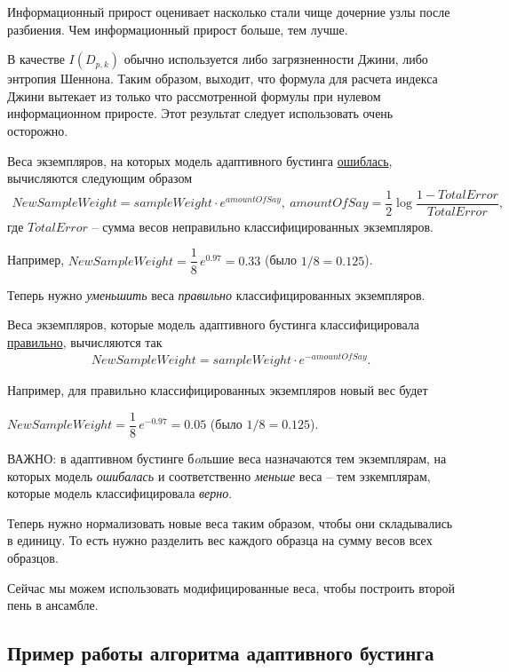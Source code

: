 \documentclass[%
	11pt,
	a4paper,
	utf8,
		]{article}
\begin{document}
Информационный прирост оценивает насколько стали чище дочерние узлы после разбиения. Чем информационный прирост больше, тем лучше.

В качестве $ I(D_{p,k}) $ обычно используется либо загрязненности Джини, либо энтропия Шеннона. Таким образом, выходит, что формула для расчета индекса Джини вытекает из только что рассмотренной формулы при нулевом информационном приросте. {\color{red} Этот результат следует использовать очень осторожно}.

Веса экземпляров, на которых модель адаптивного бустинга \underline{ошиблась}, вычисляются следующим образом
\begin{align*}
	NewSampleWeight = sampleWeight \cdot e^{amountOfSay}, \ amountOfSay = \dfrac{1}{2} \log \dfrac{ 1 - TotalError }{TotalError},
\end{align*}
где $ TotalError $ -- сумма весов неправильно классифицированных экземпляров.

Например, $ NewSampleWeight = \dfrac{1}{8}\, e^{0.97} = 0.33 $ (было $ 1/8 = 0.125 $).

Теперь нужно \emph{уменьшить} веса \emph{правильно} классифицированных экземпляров.

Веса экземпляров, которые модель адаптивного бустинга классифицировала \underline{правильно}, вычисляются так
\begin{align*}
	NewSampleWeight = sampleWeight \cdot e^{-amountOfSay}.
\end{align*}

Например, для правильно классифицированных экземпляров новый вес будет

$ NewSampleWeight = \dfrac{1}{8} \, e^{-0.97} = 0.05 $ (было $ 1/8 = 0.125 $).

ВАЖНО: в адаптивном бустинге б\emph{o}льшие веса назначаются тем экземплярам, на которых модель \emph{ошибалась} и соответственно \emph{меньше} веса -- тем эзкемплярам, которые модель классифицировала \emph{верно}.

Теперь нужно нормализовать новые веса таким образом, чтобы они складывались в единицу. То есть нужно разделить вес каждого образца на сумму весов всех образцов.

Сейчас мы можем использовать модифицированные веса, чтобы построить второй пень в ансамбле.

\subsection{Пример работы алгоритма адаптивного бустинга}
\end{document}
